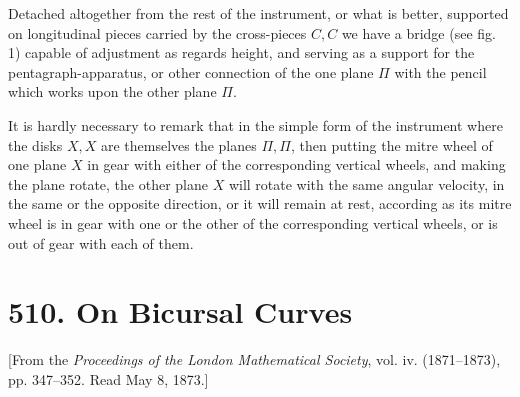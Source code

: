\documentclass[11pt,a4paper]{article}
\newcommand{\paperid}[1]{\par\medskip\noindent{\bfseries [#1]}\quad}
\begin{document}
\begin{center}
\end{center}

Detached altogether from the rest of the instrument, or what is better, supported on
longitudinal pieces carried by the cross-pieces $C,C$ we have a bridge (see fig. 1) capable
of adjustment as regards height, and serving as a support for the pentagraph-apparatus, or
other connection of the one plane $\Pi$ with the pencil which works upon the other plane
$\Pi$.

It is hardly necessary to remark that in the simple form of the instrument where the disks
$X,X$ are themselves the planes $\Pi,\Pi$, then putting the mitre wheel of one plane $X$
in gear with either of the corresponding vertical wheels, and making the plane rotate, the
other plane $X$ will rotate with the same angular velocity, in the same or the opposite
direction, or it will remain at rest, according as its mitre wheel is in gear with one or
the other of the corresponding vertical wheels, or is out of gear with each of them.

\paperid{510}
\section*{510. On Bicursal Curves}

\begin{center}
{\small [From the \emph{Proceedings of the London Mathematical Society}, vol. iv. (1871--1873),
pp. 347--352. Read May 8, 1873.]}
\end{center}
\end{document}
